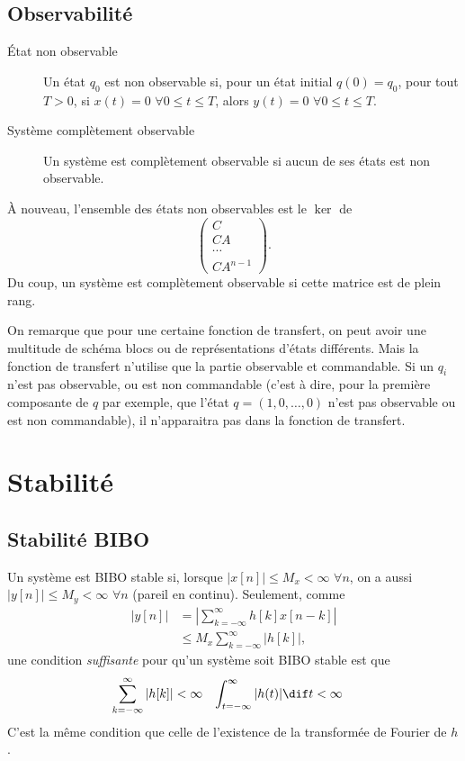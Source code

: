 \subsection{Observabilité}
\begin{description}
  \item[État non observable]
    Un état $q_0$ est non observable si,
    pour un état initial $q(0) = q_0$,
    pour tout $T > 0$, si $x(t) = 0$ $\forall 0 \leq t \leq T$, alors
    $y(t) = 0$ $\forall 0 \leq t \leq T$.
  \item[Système complètement observable]
    Un système est complètement observable si aucun de ses états est
    non observable.
\end{description}

À nouveau, l'ensemble des états non observables est le $\ker$ de
\[ \begin{pmatrix}C\\CA\\\cdots\\CA^{n-1}\end{pmatrix}. \]
Du coup, un système est complètement observable si cette matrice est de
plein rang.

On remarque que pour une certaine fonction de transfert,
on peut avoir une multitude de schéma blocs ou de représentations d'états
différents.
Mais la fonction de transfert n'utilise
que la partie observable et commandable.
Si un $q_i$ n'est pas observable, ou est non commandable
(c'est à dire, pour la première composante de $q$ par exemple, que l'état
$q = (1, 0, \ldots, 0)$ n'est pas observable ou est non commandable),
il n'apparaitra pas
dans la fonction de transfert.

\section{Stabilité}
\subsection{Stabilité BIBO}
Un système est BIBO stable si,
lorsque $|x[n]| \leq M_x < \infty$ $\forall n$,
on a aussi $|y[n]| \leq M_y < \infty$ $\forall n$ (pareil en continu).
Seulement, comme
\begin{align*}
  |y[n]| & = \left|\sum_{k=-\infty}^{\infty}h[k]x[n-k]\right|\\
         & \leq M_x \sum_{k=-\infty}^{\infty}|h[k]|,
\end{align*}
une condition \emph{suffisante} pour qu'un système soit BIBO stable est que
\begin{align*}
  \sum_{k=-\infty}^\infty |h[k]| & < \infty &
  \int_{t=-\infty}^\infty |h(t)| \dif t & < \infty
\end{align*}
C'est la même condition que celle de l'existence de la transformée de Fourier
de $h$.

